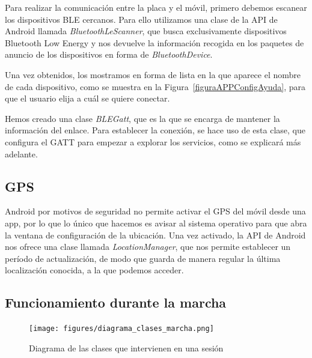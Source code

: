 Para realizar la comunicación entre la placa y el móvil, primero debemos escanear los dispositivos BLE cercanos. Para ello utilizamos una clase de la API de Android llamada \textit{BluetoothLeScanner}, que busca exclusivamente dispositivos Bluetooth Low Energy y nos devuelve la información recogida en los paquetes de anuncio de los dispositivos en forma de \textit{BluetoothDevice}.

Una vez obtenidos, los mostramos en forma de lista en la que aparece el nombre de cada dispositivo, como se muestra en la Figura~\ref{figuraAPPConfigAyuda}, para que el usuario elija a cuál se quiere conectar. 

Hemos creado una clase \textit{BLEGatt}, que es la que se encarga de mantener la información del enlace. Para establecer la conexión, se hace uso de esta clase, que configura el GATT para empezar a explorar los servicios, como se explicará más adelante.


\subsection{GPS}
\label{makereference6.2.2}

Android por motivos de seguridad no permite activar el GPS del móvil desde una app, por lo que lo único que hacemos es avisar al sistema operativo para que abra la ventana de configuración de la ubicación.
Una vez activado, la API de Android nos ofrece una clase llamada \textit{LocationManager}, que nos permite establecer un período de actualización, de modo que guarda de manera regular la última localización conocida, a la que podemos acceder.

\subsection{Funcionamiento durante la marcha}
\label{makereference6.2.3}

\begin{figure}[h]%
  \centering
    \texttt{[image: figures/diagrama\_clases\_marcha.png]} %
    \caption[Diagrama de las clases que intervienen en una sesión]{Diagrama de las clases que intervienen en una sesión}
    \label{figuraDiagramaClasesMarcha}
\end{figure}

